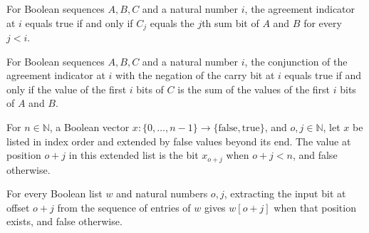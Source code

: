 \begin{theorem}
\label{BoolCircuit.agreeBit_iff}
\leanok
{}
For Boolean sequences $A,B,C$ and a natural number $i$, the agreement indicator at $i$
equals true if and only if $C_j$ equals the $j$th sum bit of $A$ and $B$ for every
$j<i$.
\end{theorem}

\begin{theorem}
\label{BoolCircuit.agree_and_noCarry_iff}
\leanok
{}
For Boolean sequences $A,B,C$ and a natural number $i$, the conjunction of the agreement
indicator at $i$ with the negation of the carry bit at $i$ equals true if and only if
the value of the first $i$ bits of $C$ is the sum of the values of the first $i$ bits of
$A$ and $B$.
\end{theorem}

\begin{definition}
\label{BoolCircuit.RippleCarry.inBits}
\leanok
For $n\in\mathbb{N}$, a Boolean vector
$x\colon\{0,\ldots,n-1\}\to\{\mathrm{false},\mathrm{true}\}$, and $o,j\in\mathbb{N}$,
let $x$ be listed in index order and extended by false values beyond its end. The value
at position $o+j$ in this extended list is the bit $x_{o+j}$ when $o+j<n$, and false
otherwise.
\end{definition}

\begin{theorem}
\label{BoolCircuit.RippleCarry.inBits_get}
\leanok
{}
For every Boolean list $w$ and natural numbers $o,j$, extracting the input bit at offset
$o+j$ from the sequence of entries of $w$ gives $w[o+j]$ when that position exists, and
false otherwise.
\end{theorem}

